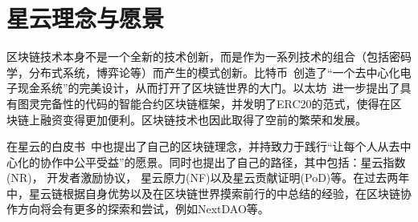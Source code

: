 \section{星云理念与愿景}
区块链技术本身不是一个全新的技术创新，而是作为一系列技术的组合（包括密码学，分布式系统，博弈论等）而产生的模式创新。比特币~\cite{Nakamoto2008}创造了“⼀个去中⼼化电⼦现⾦系统”的完美设计，从而打开了区块链世界的大门。以太坊~\cite{buterin2013ethereum}进一步提出了具有图灵完备性的代码的智能合约区块链框架，并发明了ERC20的范式，使得在区块链上融资变得更加便利。区块链技术也因此取得了空前的繁荣和发展。

在星云的白皮书~\cite{TechWhitepaper}中也提出了自己的区块链理念，并持致力于践行“让每个人从去中心化的协作中公平受益”的愿景。同时也提出了自己的路径，其中包括：星云指数(NR)， 开发者激励协议， 星云原力(NF)以及星云贡献证明(PoD)等。在过去两年中，星云链根据自身优势以及在区块链世界摸索前行的中总结的经验，在区块链协作方向将会有更多的探索和尝试，例如NextDAO等。
